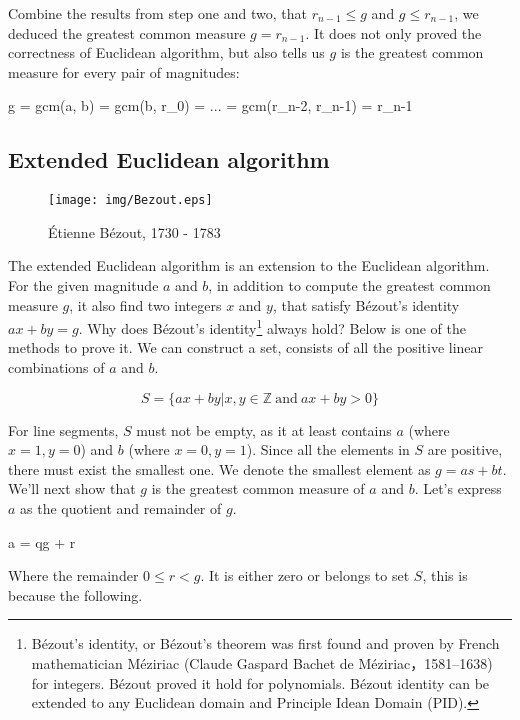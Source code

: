 \documentclass{article}
\begin{document}
Combine the results from step one and two, that $r_{n-1} \leq g$ and $g \leq r_{n-1}$, we deduced the greatest common measure $g = r_{n-1}$. It does not only proved the correctness of Euclidean algorithm, but also tells us $g$ is the greatest common measure for every pair of magnitudes:

\be
g = gcm(a, b) = gcm(b, r_0) = ... = gcm(r_{n-2}, r_{n-1}) = r_{n-1}
\label{eq:recursive-gcm}
\ee

\subsection{Extended Euclidean algorithm}

\begin{wrapfigure}{R}{0.4\textwidth}
 \centering
 \texttt{[image: img/Bezout.eps]}
 \captionsetup{labelformat=empty}
 \caption{Étienne Bézout, 1730 - 1783}
 \label{fig:Bezout}
\end{wrapfigure}

The extended Euclidean algorithm is an extension to the Euclidean algorithm. For the given magnitude $a$ and $b$, in addition to compute the greatest common measure $g$, it also find two integers $x$ and $y$, that satisfy Bézout's identity $ax + by = g$. Why does Bézout's identity\footnote{Bézout's identity, or Bézout's theorem was first found and proven by French mathematician Méziriac (Claude Gaspard Bachet de Méziriac，1581–1638) for integers. Bézout proved it hold for polynomials. Bézout identity can be extended to any Euclidean domain and Principle Idean Domain (PID).} always hold? Below is one of the methods to prove it. We can construct a set, consists of all the positive linear combinations of $a$ and $b$.

\[
S = \{ ax + by | x, y \in \mathbb{Z}\ \text{and} \ ax + by > 0\}
\]

For line segments, $S$ must not be empty, as it at least contains $a$ (where $x = 1, y = 0$) and $b$ (where $x = 0, y = 1$). Since all the elements in $S$ are positive, there must exist the smallest one. We denote the smallest element as $g = as + bt$. We'll next show that $g$ is the greatest common measure of $a$ and $b$. Let's express $a$ as the quotient and remainder of $g$.

\be
a = qg + r
\label{eq:Euclidean-division}
\ee

Where the remainder $0 \leq r < g$. It is either zero or belongs to set $S$, this is because the following.
\end{document}
